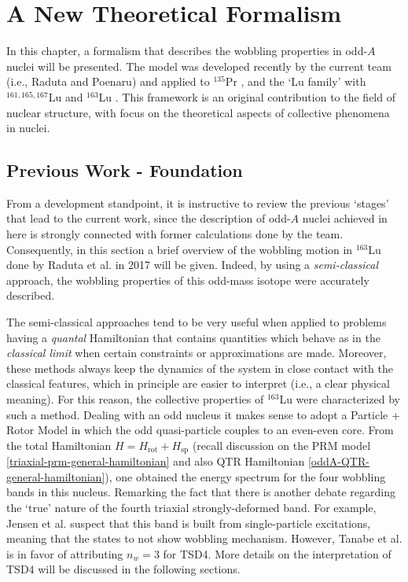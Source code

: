 \chapter{A New Theoretical Formalism}

In this chapter, a formalism that describes the wobbling properties in odd-$A$ nuclei will be presented. The model was developed recently by the current team (i.e., Raduta and Poenaru) and applied to $^{135}$Pr \cite{raduta2020new}, and the `Lu family' with $^{161,165,167}$Lu \cite{raduta2020approach} and $^{163}$Lu \cite{raduta2020approach,raduta2020towards,poenaru2021parity,poenaru2021extensive1,poenaru2021extensive2}. This framework is an original contribution to the field of nuclear structure, with focus on the theoretical aspects of collective phenomena in nuclei.

\section{Previous Work - Foundation}
\label{foundation}

From a development standpoint, it is instructive to review the previous `stages' that lead to the current work, since the description of odd-$A$ nuclei achieved in here is strongly connected with former calculations done by the team. Consequently, in this section a brief overview of the wobbling motion in $^{163}$Lu done by Raduta et al. in 2017 \cite{raduta2017semiclassical} will be given. Indeed, by using a \emph{semi-classical} approach, the wobbling properties of this odd-mass isotope were accurately described.

The semi-classical approaches tend to be very useful when applied to problems having a \emph{quantal} Hamiltonian that contains quantities which behave as in the \emph{classical limit} when certain constraints or approximations are made. Moreover, these methods always keep the dynamics of the system in close contact with the classical features, which in principle are easier to interpret (i.e., a clear physical meaning). For this reason, the collective properties of $^{163}$Lu were characterized by such a method. Dealing with an odd nucleus it makes sense to adopt a Particle + Rotor Model in which the odd quasi-particle couples to an even-even core. From the total Hamiltonian $H=H_\text{rot}+H_\text{sp}$ (recall discussion on the PRM model \ref{triaxial-prm-general-hamiltonian} and also QTR Hamiltonian \ref{oddA-QTR-general-hamiltonian}), one obtained the energy spectrum for the four wobbling bands in this nucleus. Remarking the fact that there is another debate regarding the `true' nature of the fourth triaxial strongly-deformed band. For example, Jensen et al. \cite{jensen2004coexisting} suspect that this band is built from single-particle excitations, meaning that the states to not show wobbling mechanism. However, Tanabe et al. \cite{tanabe2008selection} is in favor of attributing $n_w=3$ for TSD4. More details on the interpretation of TSD4 will be discussed in the following sections.

